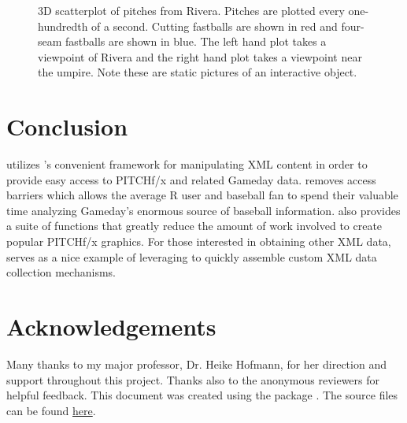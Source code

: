 \begin{article}
\begin{figure}[h]
\caption{3D scatterplot of pitches from Rivera. Pitches are plotted every one-hundredth
of a second. Cutting fastballs are shown in red and four-seam fastballs
are shown in blue. The left hand plot takes a viewpoint of Rivera
and the right hand plot takes a viewpoint near the umpire. Note these
are static pictures of an interactive object. \label{fig:rgl}}
\end{figure}



\section{Conclusion}

 utilizes 's convenient framework for manipulating
XML content in order to provide easy access to PITCHf/x and related
Gameday data.  removes access barriers which allows
the average R user and baseball fan to spend their valuable time analyzing
Gameday's enormous source of baseball information. 
also provides a suite of functions that greatly reduce the amount
of work involved to create popular PITCHf/x graphics. For those interested
in obtaining other XML data,  serves as a nice example
of leveraging  to quickly assemble custom XML data collection
mechanisms.

\section{Acknowledgements}
Many thanks to my major professor, Dr. Heike Hofmann, for her direction
and support throughout this project. Thanks also to the anonymous
reviewers for helpful feedback. This document was created using the
 package \citet{knitr}. The source files can be found
\href{https://github.com/cpsievert/RJournal-pitchRx}{here}.






\address{Carson Sievert\\
Department of Statistics\\
Iowa State University}\\

\end{article}
